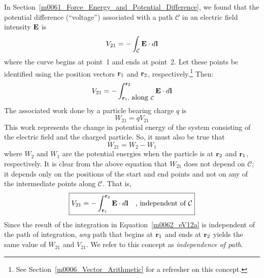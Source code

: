 

\label{m0062_Independence_of_Path} %

In Section~\ref{m0061_Force_Energy_and_Potential_Difference}, we found that the potential difference (``voltage'') associated with a path ${\mathcal C}$ in an electric field intensity ${\bf E}$ is
%
\begin{equation}
V_{21} = - \int_{\mathcal C} {\bf E} \cdot d{\bf l}
\end{equation}
%
where the curve begins at point~1 and ends at point~2.
Let these points be identified using the position vectors ${\bf r}_1$ and ${\bf r}_2$, respectively.\footnote{See Section~\ref{m0006_Vector_Arithmetic} for a refresher on this concept.}
Then:
%
\begin{equation}
V_{21} = - \int_{{\bf r}_1,~\mbox{along}~\mathcal{C}}^{{\bf r}_2} {\bf E} \cdot d{\bf l}
\end{equation}
%
The associated work done by a particle bearing charge $q$ is
%
\begin{equation}
W_{21} = qV_{21}
\end{equation}
%
This work represents the change in potential energy of the system consisting of the electric field and the charged particle.  So, it must also be true that 
%
\begin{equation}
W_{21} = W_2 - W_1
\end{equation}
%
where $W_2$ and $W_1$ are the potential energies when the particle is at ${\bf r}_2$ and ${\bf r}_1$, respectively.
It is clear from the above equation that $W_{21}$ does not depend on ${\mathcal C}$; it depends only on the positions of the start and end points and not on any of the intermediate points along ${\mathcal C}$.  That is,
%
\begin{equation}
\boxed{
V_{21} = - \int_{{\bf r}_1}^{{\bf r}_2} {\bf E} \cdot d{\bf l} ~~~\mbox{, independent of}~\mathcal{C}
}
\label{m0062_eV12a}
\end{equation}
%
Since the result of the integration in Equation~\ref{m0062_eV12a} is independent of the path of integration, \emph{any} path that begins at ${\bf r}_1$ and ends at ${\bf r}_2$ yields the same value of $W_{21}$ and $V_{21}$.
We refer to this concept as \emph{independence of path}.

